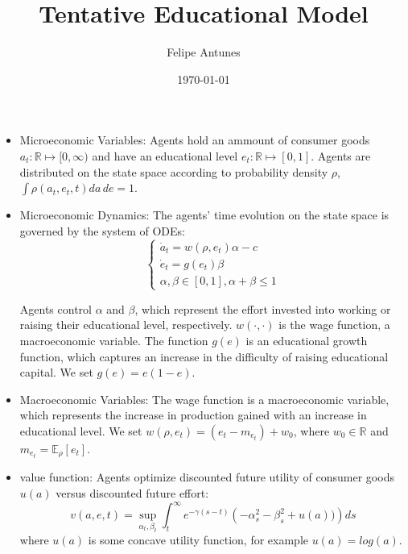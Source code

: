 \documentclass{article}
\title{Tentative Educational Model}
\author{Felipe Antunes}
\date{\today}
\begin{document}
\maketitle

\begin{itemize}
    \item Microeconomic Variables: Agents hold an ammount of consumer goods $a_t:\mathbb{R} \mapsto [0,\infty)$ and have an educational level $e_t: \mathbb{R} \mapsto [0,1]$. 
    Agents are distributed on the state space according to probability density $\rho$, $\int \rho(a_t, e_t, t) da\, de = 1$.
    \item Microeconomic Dynamics: The agents' time evolution on the state space is governed by the system of ODEs:
    \begin{equation}
        \begin{cases}
            \dot a_t = w(\rho, e_t)\alpha - c \\
            \dot e_t = g(e_t)\beta \\
            \alpha, \beta \in [0,1], \alpha + \beta \leq 1
        \end{cases}
    \end{equation}

    Agents control $\alpha$ and $\beta$, which represent the effort invested into working or raising their educational level, respectively. $w(\cdot, \cdot)$ is the wage function,
    a macroeconomic variable. The function $g(e)$ is an educational growth function, which captures an increase in the difficulty of raising educational capital. We set  
    $g(e) = e(1-e)$.
    \item Macroeconomic Variables: The wage function is a macroeconomic variable, which represents the increase in production gained with an increase in educational level.
    We set $w(\rho, e_t) = (e_t - m_{e_t}) + w_0$, where $w_0 \in \mathbb{R}$ and $m_{e_t} = \mathbb{E}_\rho [e_t]$.
    \item value function: Agents optimize discounted future utility of consumer goods $u(a)$ versus discounted future effort:
    \begin{equation}
        v(a,e,t) = \sup_{\alpha_t, \beta_t} \int_t^\infty e^{- \gamma (s - t)} \left( - \alpha_s^2 - \beta_s^2 + u(a)) \right) ds
    \end{equation}
    where $u(a)$ is some concave utility function, for example $u(a) = log(a)$.


\end{itemize}
\end{document}
